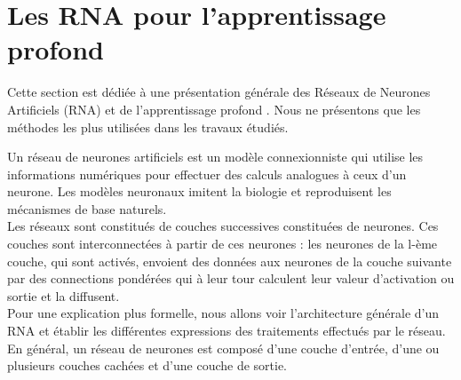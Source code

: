 \pagestyle{fancy}

\renewcommand{\footrulewidth}{1pt}

\fancyhead[L]{\footnotesize \rightmark}
\fancyhead[C]{\thepage}

\fancyfoot[C]{\thepage}


\chapter*{Les RNA pour l'apprentissage profond} \label{rna}

Cette section est dédiée à une présentation générale des Réseaux de Neurones Artificiels (RNA) et de l'apprentissage profond \cite{deepweb}. Nous ne présentons que les méthodes les plus utilisées dans  les travaux étudiés.\\
\smallskip

\qquad Un réseau de neurones artificiels est un modèle connexionniste qui utilise les informations numériques pour effectuer des calculs analogues à ceux d'un neurone. Les modèles neuronaux imitent la biologie et reproduisent les mécanismes de base naturels.\\
	Les réseaux sont constitués de couches successives constituées de neurones. Ces couches sont interconnectées à partir de ces neurones : les neurones de la l-ème couche, qui sont activés, envoient des données aux neurones de la couche suivante par des connections pondérées qui à leur tour calculent leur valeur d'activation ou sortie et la diffusent.\\
	Pour une explication plus formelle, nous allons voir l'architecture générale d'un RNA et établir les différentes expressions des traitements effectués par le réseau.\\
En général, un réseau de neurones est composé d'une couche d'entrée, d'une ou plusieurs couches cachées et d'une couche de sortie.

